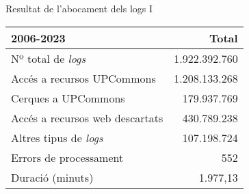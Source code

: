 \begin{frame}{Resultat de l'abocament dels logs I}
    \begin{table}[!t]
        \label{tab:table1}
        \centering
        \begin{tabular}{@{} lr @{}}
            \toprule
            \textbf{2006-2023} & Total\\
            \midrule
            Nº total de \textit{logs}       & 1.922.392.760\\
            Accés a recursos UPCommons      & 1.208.133.268\\
            Cerques a UPCommons             & 179.937.769\\
            Accés a recursos web descartats & 430.789.238\\
            Altres tipus de \textit{logs}   & 107.198.724\\
            Errors de processament          & 552\\
            Duració (minuts)                & 1.977,13\\
            \bottomrule
        \end{tabular}
    \end{table}
\end{frame}

